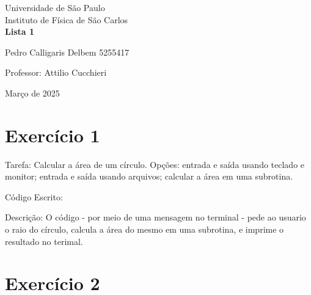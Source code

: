 \documentclass[12pt, a4paper]{article} %
\begin{document}
	
	\begin{titlepage}
		\begin{center}
\Huge{Universidade de São Paulo}\\
\large{Instituto de Física de São Carlos}\\
\vspace{20pt}
\vspace{200pt}
\textbf{Lista 1}\\
\vspace{8cm}
		\end{center}

\begin{flushleft}
\begin{tabbing}
Pedro Calligaris Delbem 5255417\\
\end{tabbing}
\vspace{0.5cm}
Professor: Attilio Cucchieri\\		
		\end{flushleft}
	
		\begin{center}
			\vspace{\fill}
	Março de 2025	
		\end{center}
	\end{titlepage}

	\tableofcontents 
	\thispagestyle{empty}
	\newpage
\section{Exerc\'icio 1}

Tarefa: Calcular a \'area de um c\'irculo. Op\c{c}\~oes: entrada e sa\'ida usando teclado e monitor; entrada e sa\'ida usando arquivos; calcular a  \'area em uma subrotina.

C\'odigo Escrito:


Descri\c{c}\~ao: O c\'odigo - por meio de uma mensagem no terminal - pede ao usuario o raio do c\'irculo, calcula a \'area do mesmo em uma subrotina, e imprime o resultado no terimal.

\section{Exerc\'icio 2}
\end{document}
